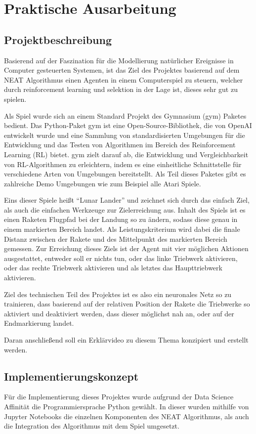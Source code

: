 \chapter{Praktische Ausarbeitung}
\label{chapter:3}
\section{Projektbeschreibung}
Basierend auf der Faszination für die Modellierung natürlicher Ereignisse in Computer gesteuerten Systemen, ist das Ziel des Projektes basierend auf dem NEAT Algorithmus einen Agenten in einem Computerspiel zu steuern, welcher durch reinforcement learning und selektion in der Lage ist, dieses sehr gut zu spielen.

Als Spiel wurde sich an einem Standard Projekt des Gymnasium (gym) Paketes bedient. Das Python-Paket gym ist eine Open-Source-Bibliothek, die von OpenAI entwickelt wurde und eine Sammlung von standardisierten Umgebungen für die Entwicklung und das Testen von Algorithmen im Bereich des Reinforcement Learning (RL) bietet. gym zielt darauf ab, die Entwicklung und Vergleichbarkeit von RL-Algorithmen zu erleichtern, indem es eine einheitliche Schnittstelle für verschiedene Arten von Umgebungen bereitstellt. Als Teil dieses Paketes gibt es zahlreiche Demo Umgebungen wie zum Beispiel alle Atari Spiele. 

Eins dieser Spiele heißt \enquote{Lunar Lander} und zeichnet sich durch das einfach Ziel, als auch die einfachen Werkzeuge zur Zielerreichung aus. Inhalt des Spiels ist es einen Raketen Flugpfad bei der Landung so zu ändern, sodass diese genau in einem markierten Bereich landet. Als Leistungskriterium wird dabei die finale Distanz zwischen der Rakete und des Mittelpunkt des markierten Bereich gemessen. Zur Erreichung dieses Ziels ist der Agent mit vier möglichen Aktionen ausgestattet, entweder soll er nichts tun, oder das linke Triebwerk aktivieren, oder das rechte Triebwerk aktivieren und als letztes das Haupttriebwerk aktivieren.

Ziel des technischen Teil des Projektes ist es also ein neuronales Netz so zu trainieren, dass basierend auf der relativen Position der Rakete die Triebwerke so aktiviert und deaktiviert werden, dass dieser möglichst nah an, oder auf der Endmarkierung landet. 

Daran anschließend soll ein Erklärvideo zu diesem Thema konzipiert und erstellt werden.

\section{Implementierungskonzept}
Für die Implementierung dieses Projektes wurde aufgrund der Data Science Affinität die Programmiersprache Python gewählt. In dieser wurden mithilfe von Jupyter Notebooks die einzelnen Komponenten des NEAT Algorithmus, als auch die Integration des Algorithmus mit dem Spiel umgesetzt. 

